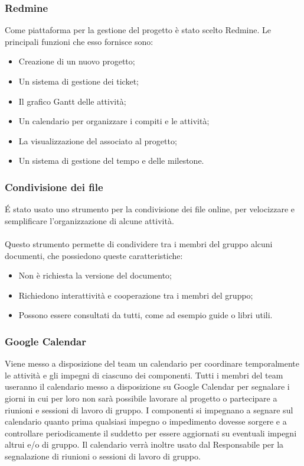 \subsubsection{Redmine}
\label{4.1}
Come piattaforma per la gestione del progetto è stato scelto Redmine. Le principali funzioni che esso fornisce sono:
\begin{itemize}
\item Creazione di un nuovo progetto;
\item Un sistema di gestione dei ticket;
\item Il grafico Gantt delle attività;
\item Un calendario per organizzare i compiti e le attività;
\item La visualizzazione del  associato al progetto;
\item Un sistema di  gestione del tempo e delle milestone.
\end{itemize}



\subsubsection{Condivisione dei file}
\'E stato usato uno strumento per la condivisione dei file online, per velocizzare e semplificare l'organizzazione di alcune attività.

\paragraph{}
\label{gdrive}
Questo strumento permette di condividere tra i membri del gruppo alcuni documenti, che possiedono queste caratteristiche:
\begin{itemize}
\item Non è richiesta la versione del documento;
\item Richiedono interattività e cooperazione tra i membri del gruppo;
\item Possono essere consultati da tutti, come ad esempio guide o libri utili.
\end{itemize}

\subsubsection{Google Calendar}
\label{4.2}
Viene messo a disposizione del team un calendario per coordinare temporalmente le attività e gli impegni di ciascuno dei componenti.
Tutti i membri del team useranno il calendario messo a disposizione su Google Calendar per segnalare i giorni in cui per loro non sarà possibile lavorare al progetto o partecipare a riunioni e sessioni di lavoro di gruppo. I componenti si impegnano a segnare sul calendario quanto prima qualsiasi impegno o impedimento dovesse sorgere e a controllare periodicamente il suddetto per essere aggiornati su eventuali impegni altrui e/o di gruppo.
Il calendario verrà inoltre usato dal Responsabile per la segnalazione di riunioni o sessioni di lavoro di gruppo.

